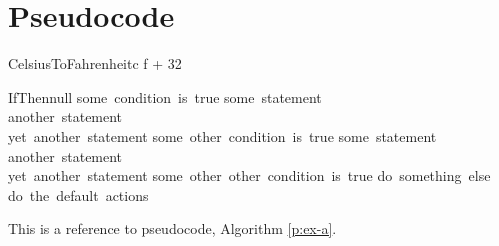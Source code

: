 \section{Pseudocode}


\begin{pseudocode}{CelsiusToFahrenheit}{c}\label{p:ex-a}
f  + 32 \\
\end{pseudocode}



\begin{pseudocode}{IfThen}{\mbox{null}}
\IF \mbox{some condition is true}
\THEN
    \BEGIN
        \mbox{some statement} \\
        \mbox{another statement} \\
        \mbox{yet another statement}
    \END
\ELSEIF \mbox{some other condition is true}
\THEN
    \BEGIN
        \mbox{some statement} \\
        \mbox{another statement} \\
        \mbox{yet another statement}
    \END
\ELSEIF \mbox{some other other condition is true}
\THEN
    \mbox{do something else}
\ELSE
    \mbox{do the default actions}
\end{pseudocode}


This is a reference to pseudocode, Algorithm \ref{p:ex-a}.
